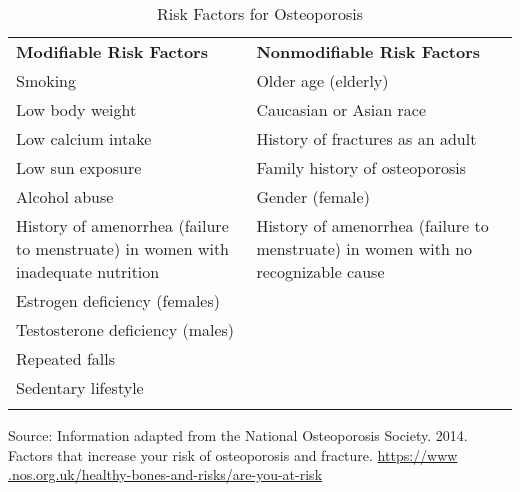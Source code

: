 \documentclass[title={Chapter 9}]{fdsn201notes}
\begin{document}
\begin{table}[H]
	\centering
	\begin{threeparttable}
		\caption{Risk Factors for Osteoporosis}
		\label{tab:risk-factors-for-osteoporosis}
		\begin{tabular}{p{} p{}}
			\rowcolor{rowdarkgreen}\textbf{Modifiable Risk Factors} & \textbf{Nonmodifiable Risk Factors}\\
			Smoking & Older age (elderly)\\
			Low body weight & Caucasian or Asian race\\
			Low calcium intake & History of fractures as an adult\\
			Low sun exposure & Family history of osteoporosis\\
			Alcohol abuse & Gender (female)\\
			History of amenorrhea (failure to menstruate) in women with inadequate nutrition & History of amenorrhea (failure to menstruate) in women with no recognizable cause\\
			Estrogen deficiency (females) & \\
			Testosterone deficiency (males) & \\
			Repeated falls & \\
			Sedentary lifestyle & \\
			\rowcolor{rowdarkgreen} & \\
		\end{tabular}
		\begin{tablenotes}
			\small
			\item Source: Information adapted from the National Osteoporosis Society. 2014. Factors that increase your risk of osteoporosis and fracture. \url{https://www .nos.org.uk/healthy-bones-and-risks/are-you-at-risk}
		\end{tablenotes}
	\end{threeparttable}
\end{table}
\end{document}
